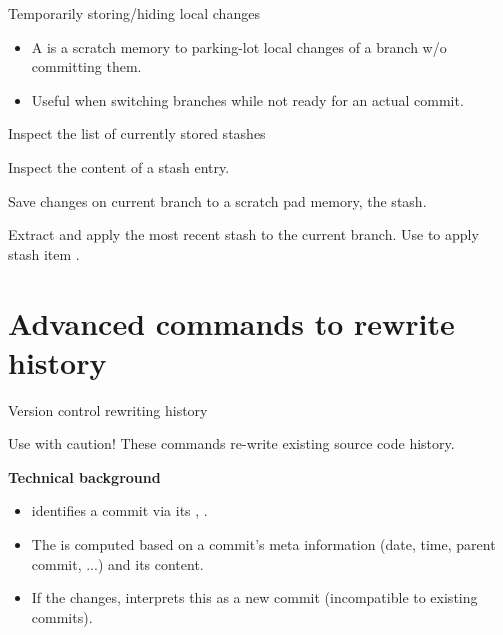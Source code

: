 \begin{frame}{Temporarily storing/hiding local changes}

\begin{itemize}
\item A  is a scratch memory to parking-lot local changes of a branch w/o committing them.
\item Useful when switching branches while not ready for an actual commit.
\end{itemize}
\begin{block}{}
Inspect the list of currently stored stashes
\end{block}
\begin{block}{}
Inspect the content of a stash entry.
\end{block}
\begin{block}{}
Save changes on current branch to a scratch pad memory, {\ie} the stash.
\end{block}
\begin{block}{}
Extract and apply the most recent stash to the current branch.
Use  to apply stash item .
\end{block}
\end{frame}

\section{Advanced  commands to rewrite history}

\begin{frame}{Version control {\vs} rewriting history}
\begin{alertblock}{Use with caution!}
These commands re-write existing source code history.
\end{alertblock}

\textbf{Technical background}
\begin{itemize}
\item {} identifies a commit via its , {\eg} .
\item The  is computed based on a commit's meta information (date, time, parent commit, ...) and its content.
\item If the  changes,  interprets this as a new commit (incompatible to existing commits). 
\end{itemize}
\end{frame}

